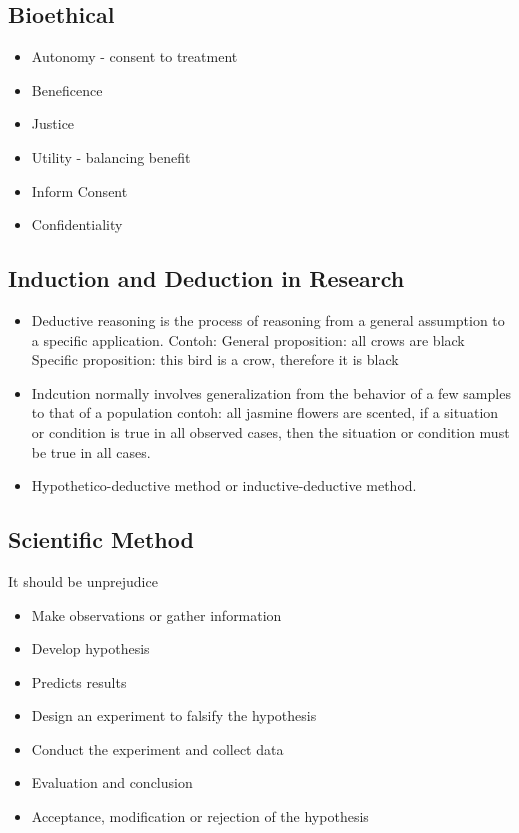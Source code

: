 \documentclass[
  letterpaper,
  DIV=11,
  numbers=noendperiod]{scrreprt}
\providecommand{\tightlist}{%
  \setlength{\itemsep}{0pt}\setlength{\parskip}{0pt}}\usepackage{longtable,booktabs,array}
\begin{document}
\subsection{Bioethical}\label{bioethical}

\begin{itemize}
\tightlist
\item
  Autonomy - consent to treatment
\item
  Beneficence
\item
  Justice
\item
  Utility - balancing benefit
\item
  Inform Consent
\item
  Confidentiality
\end{itemize}

\subsection{Induction and Deduction in
Research}\label{induction-and-deduction-in-research}

\begin{itemize}
\item
  Deductive reasoning is the process of reasoning from a general
  assumption to a specific application. Contoh: General proposition: all
  crows are black Specific proposition: this bird is a crow, therefore
  it is black
\item
  Indcution normally involves generalization from the behavior of a few
  samples to that of a population contoh: all jasmine flowers are
  scented, if a situation or condition is true in all observed cases,
  then the situation or condition must be true in all cases.
\item
  Hypothetico-deductive method or inductive-deductive method.
\end{itemize}

\subsection{Scientific Method}\label{scientific-method}

It should be unprejudice

\begin{itemize}
\tightlist
\item
  Make observations or gather information
\item
  Develop hypothesis
\item
  Predicts results
\item
  Design an experiment to falsify the hypothesis
\item
  Conduct the experiment and collect data
\item
  Evaluation and conclusion
\item
  Acceptance, modification or rejection of the hypothesis
\end{itemize}
\end{document}
